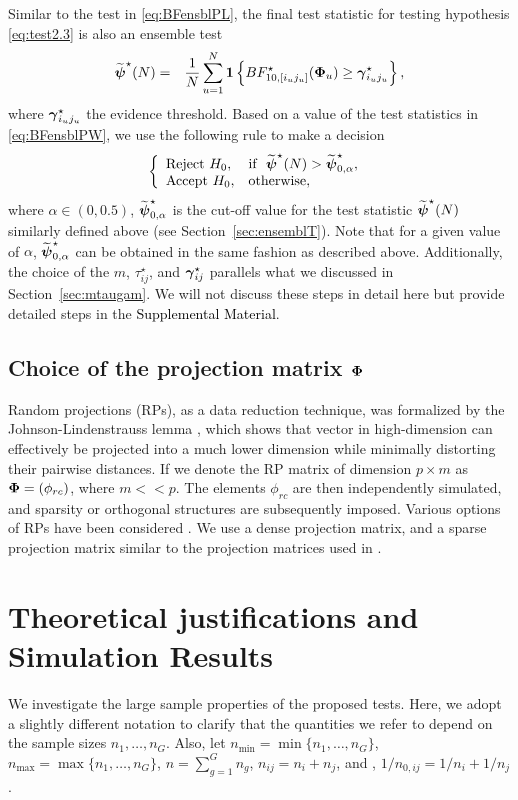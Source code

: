 \documentclass[alpha-refs]{wiley-article}
\theoremstyle{plain}%
\theoremstyle{definition}
\def\be{\begin{eqnarray}}
\def\ee{\end{eqnarray}}
\def\boldpsi{{\mbox{\boldmath $\psi$}}}
\def\bone{{\mathbf 1}}
\newcommand{\ugamma}            {\mbox{\boldmath$\gamma$}}
\newcommand{\uPhi}              {\mbox{\boldmath$\Phi$}}
\begin{document}
Similar to the test in \eqref{eq:BFensblPL}, the final test statistic for testing hypothesis \eqref{eq:test2.3} is also an ensemble test 
\be
\widetilde{\boldpsi}^{\star}(N) &=& \frac{1}{N}\sum^{N}_{u=1} \bone \left\{ BF^{\star}_{10, [i_u j_u]}(\uPhi_u) \geq \ugamma^{\star}_{i_u j_u} \right\}, \label{eq:BFensblPW}
\ee
where $\ugamma^{\star}_{i_u j_u}$ the evidence threshold. 
Based on a value of the test statistics in \eqref{eq:BFensblPW}, we use the following rule to make a decision
\be
 \left \{
       \begin{array}{llll}
       \mbox{Reject}~ H_{0}, & \mbox{if} ~~ \widetilde{\boldpsi}^{\star}(N) > \widetilde{\boldpsi}^{\star}_{0, \alpha},  \\
       \mbox{Accept}~ H_{0}, & \mbox{otherwise}, \label{eq:ensembleTestPw}
       \end{array}
       \right. \;
\ee
where $\alpha \in (0, 0.5)$, $\widetilde{\boldpsi}^{\star}_{0, \alpha}$ is the cut-off value for the test statistic $\widetilde{\boldpsi}^{\star}(N)$ similarly defined above (see Section~\ref{sec:ensemblT}). Note that for a given value of $\alpha$, $\widetilde{\boldpsi}^{\star}_{0, \alpha}$ can be obtained in the same fashion as described above. Additionally, the choice of the $m$, $\tau^{\star}_{ij}$, and $\ugamma^{\star}_{ij}$ parallels what we discussed in Section~\ref{sec:mtaugam}. We will not discuss these steps in detail here but provide detailed steps in the \textcolor{black}{Supplemental Material}.    

\subsection{Choice of the projection matrix $\uPhi$}
Random projections (RPs), as a data reduction technique, was formalized by the Johnson-Lindenstrauss lemma \citep{johnson84extensionslipschitz}, which shows that vector in high-dimension can effectively be projected into a much lower dimension while minimally distorting their pairwise distances. If we denote the RP matrix of dimension $p \times m$ as $\uPhi = (\phi_{rc})$, where $m << p$. The elements $\phi_{rc}$ are then independently simulated, and sparsity or orthogonal structures are subsequently imposed. Various options of RPs have been considered \citep{achlioptas2001database,li2006very,lopes2011more}. We use a dense projection matrix, and a sparse projection matrix similar to the projection matrices used in \citep{srivastava2014raptt,zoh2018powerful}.      

\section{Theoretical justifications and Simulation Results} \label{sec:theori}
We investigate the large sample properties of the proposed tests. 
Here, we adopt a slightly different notation to clarify that the quantities we refer to depend on the sample sizes $n_1, \ldots, n_{G}$. Also, let $n_{\min} = \min\{n_1,\ldots, n_{G}\}$, $n_{\max} = \max\{n_1,\ldots, n_{G}\}$, $n = \sum^{G}_{g=1}n_g$, $n_{ij} = n_i + n_j$, and , $1/n_{0,ij} = 1/n_i + 1/n_j$. %
\end{document}
